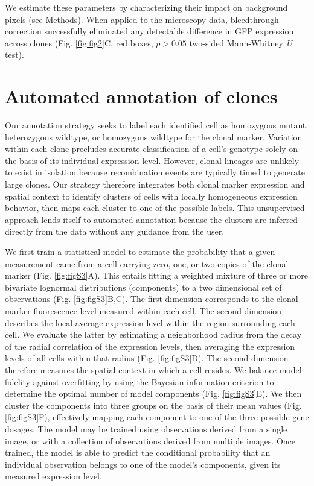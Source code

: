 We estimate these parameters by characterizing their impact on background pixels (see Methods). When applied to the microscopy data, bleedthrough correction successfully eliminated any detectable difference in GFP expression across clones (Fig. \ref{fig:fig2}C, red boxes, $p>0.05$ two-sided Mann-Whitney \textit{U} test).


\section{Automated annotation of clones}
\label{ch:annotation}

Our annotation strategy seeks to label each identified cell as homozygous mutant, heterozygous wildtype, or homozygous wildtype for the clonal marker. Variation within each clone precludes accurate classification of a cell's genotype solely on the basis of its individual expression level. However, clonal lineages are unlikely to exist in isolation because recombination events are typically timed to generate large clones. Our strategy therefore integrates both clonal marker expression and spatial context to identify clusters of cells with locally homogeneous expression behavior, then maps each cluster to one of the possible labels. This unsupervised approach lends itself to automated annotation because the clusters are inferred directly from the data without any guidance from the user.

We first train a statistical model to estimate the probability that a given measurement came from a cell carrying zero, one, or two copies of the clonal marker (Fig. \ref{fig:figS3}A). This entails fitting a weighted mixture of three or more bivariate lognormal distributions (components) to a two dimensional set of observations (Fig. \ref{fig:figS3}B,C). The first dimension corresponds to the clonal marker fluorescence level measured within each cell. The second dimension describes the local average expression level within the region surrounding each cell. We evaluate the latter by estimating a neighborhood radius from the decay of the radial correlation of the expression levels, then averaging the expression levels of all cells within that radius (Fig. \ref{fig:figS3}D). The second dimension therefore measures the spatial context in which a cell resides. We balance model fidelity against overfitting by using the Bayesian information criterion to determine the optimal number of model components (Fig. \ref{fig:figS3}E). We then cluster the components into three groups on the basis of their mean values (Fig. \ref{fig:figS3}F), effectively mapping each component to one of the three possible gene dosages. The model may be trained using observations derived from a single image, or with a collection of observations derived from multiple images. Once trained, the model is able to predict the conditional probability that an individual observation belongs to one of the model's components, given its measured expression level.

